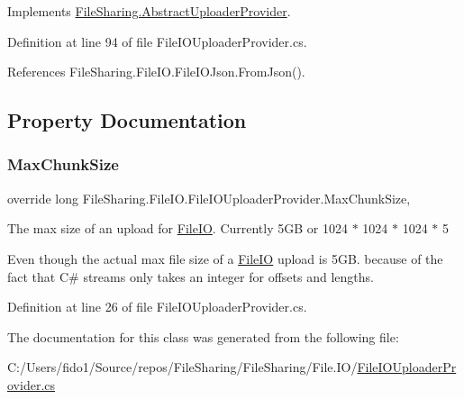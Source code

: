 Implements \hyperlink{class_file_sharing_1_1_abstract_uploader_provider_a7f85a810557b4bd71443eb2008547647}{File\+Sharing.\+Abstract\+Uploader\+Provider}.



Definition at line 94 of file File\+I\+O\+Uploader\+Provider.\+cs.



References File\+Sharing.\+File\+I\+O.\+File\+I\+O\+Json.\+From\+Json().



\subsection{Property Documentation}
\mbox{\label{class_file_sharing_1_1_file_i_o_1_1_file_i_o_uploader_provider_a71681d081bcdb7e871b4866c6a5c0c97}} 
\subsubsection{\texorpdfstring{Max\+Chunk\+Size}{MaxChunkSize}}
{\footnotesize\ttfamily override long File\+Sharing.\+File\+I\+O.\+File\+I\+O\+Uploader\+Provider.\+Max\+Chunk\+Size\hspace{0.3cm}{\ttfamily [get]}, {}}



The max size of an upload for \hyperlink{namespace_file_sharing_1_1_file_i_o}{File\+IO}. Currently 5\+GB or 1024 $\ast$ 1024 $\ast$ 1024 $\ast$ 5 

Even though the actual max file size of a \hyperlink{namespace_file_sharing_1_1_file_i_o}{File\+IO} upload is 5\+GB. because of the fact that C\# streams only takes an integer for offsets and lengths. 

Definition at line 26 of file File\+I\+O\+Uploader\+Provider.\+cs.



The documentation for this class was generated from the following file\+:\begin{DoxyCompactItemize}
\item 
C\+:/\+Users/fido1/\+Source/repos/\+File\+Sharing/\+File\+Sharing/\+File.\+I\+O/\hyperlink{_file_i_o_uploader_provider_8cs}{File\+I\+O\+Uploader\+Provider.\+cs}\end{DoxyCompactItemize}
